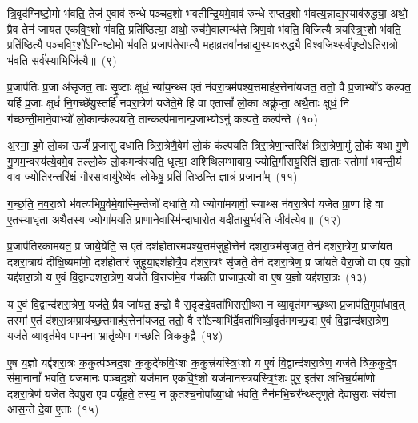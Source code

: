 त्रि॒वृद॑ग्निष्टो॒मो भ॑वति॒ तेज॑ ए॒वाव॑ रुन्धे पञ्चद॒शो भ॑वतीन्द्रि॒यमे॒वाव॑ रुन्धे सप्तद॒शो भ॑वत्य॒न्नाद्य॒स्याव॑रुद्ध्या॒ अथो॒ प्रैव तेन॑ जायत एकवि॒ꣳ॒शो भ॑वति॒ प्रति॑ष्ठित्या॒ अथो॒ रुच॑मे॒वात्मन्ध॑त्ते त्रिण॒वो भ॑वति॒ विजि॑त्यै त्रयस्त्रि॒ꣳ॒शो भ॑वति॒ प्रति॑ष्ठित्यै पञ्चवि॒ꣳ॒शो᳚\-ऽग्निष्टो॒मो भ॑वति प्र॒जाप॑ते॒राप्त्यै॑ महाव्र॒तवा॑न॒न्नाद्य॒स्याव॑रुद्ध्यै विश्व॒जिथ्सर्व॑पृष्ठो\-ऽतिरा॒त्रो भ॑वति॒ सर्व॑स्या॒भिजि॑त्यै॥~(९)

{}%

प्र॒जा\-प॑तिः प्र॒जा अ॑सृजत॒ ताः सृ॒ष्टाः क्षुधं॒ न्या॑य॒न्थ्स ए॒तं न॑वरा॒त्रम॑पश्य॒त्तमाह॑र॒त्तेना॑यजत॒ ततो॒ वै प्र॒जाभ्यो॑\-ऽ कल्पत॒ यर्\mbox{}हि॑ प्र॒जाः क्षुधं॑ नि॒गच्छे॑यु॒स्तर्\mbox{}हि॑ नवरा॒त्रेण॑ यजेते॒मे हि वा ए॒तासां᳚ लो॒का अकॢ॑प्ता॒ अथै॒ताः क्षुधं॒ नि ग॑च्छन्ती॒माने॒वाभ्यो॑ लो॒कान्क॑ल्पयति॒ तान्कल्प॑मानान्प्र॒जाभ्यो\-ऽनु॑ कल्पते॒ कल्प॑न्ते~(१०)

अ॒स्मा॒ इ॒मे लो॒का ऊर्जं॑ प्र॒जासु॑ दधाति त्रिरा॒त्रेणै॒वेमं लो॒कं क॑ल्पयति त्रिरा॒त्रेणा॒न्तरि॑क्षं त्रिरा॒त्रेणा॒मुं लो॒कं यथा॑ गु॒णे गु॒णम॒न्वस्य॑त्ये॒वमे॒व तल्लो॒के लो॒कमन्व॑स्यति॒ धृत्या॒ अशि॑थिलम्भावाय॒ ज्योति॒र्गौरायु॒रिति॑ ज्ञा॒ताः स्तोमा॑ भवन्ती॒यं वाव ज्योति॑र॒न्तरि॑क्षं॒ गौर॒सावायु॑रे॒ष्वे॑व लो॒केषु॒ प्रति॑ तिष्ठन्ति॒ ज्ञात्रं॑ प्र॒जाना᳚म्~(११)

ग॒च्छ॒ति॒ न॒व॒रा॒त्रो भ॑वत्यभिपू॒र्वमे॒वास्मि॒न्तेजो॑ दधाति॒ यो ज्योगा॑मयावी॒ स्याथ्स न॑वरा॒त्रेण॑ यजेत प्रा॒णा हि वा ए॒तस्याधृ॑ता॒ अथै॒तस्य॒ ज्योगा॑मयति प्रा॒णाने॒वास्मि॑न्दाधारो॒त यदी॒तासु॒र्भव॑ति॒ जीव॑त्ये॒व॥~(१२)

{\anuvakamend[{कल्प॑न्ते प्र॒जाना॒न्त्रय॑स्त्रिꣳशच्च}]}%

प्र॒जा\-प॑तिरकामयत॒ प्र जा॑ये॒येति॒ स ए॒तं दश॑होतारमपश्य॒त्तम॑जुहो॒त्तेन॑ दशरा॒त्रम॑सृजत॒ तेन॑ दशरा॒त्रेण॒ प्राजा॑यत दशरा॒त्राय॑ दीक्षि॒ष्यमा॑णो॒ दश॑होतारं जुहुया॒द्दश॑होत्रै॒व द॑शरा॒त्रꣳ सृ॑जते॒ तेन॑ दशरा॒त्रेण॒ प्र जा॑यते वैरा॒जो वा ए॒ष य॒ज्ञो यद्द॑शरा॒त्रो य ए॒वं वि॒द्वान्द॑शरा॒त्रेण॒ यज॑ते वि॒राज॑मे॒व ग॑च्छति प्राजाप॒त्यो वा ए॒ष य॒ज्ञो यद्द॑शरा॒त्रः~(१३)

य ए॒वं वि॒द्वान्द॑शरा॒त्रेण॒ यज॑ते॒ प्रैव जा॑यत॒ इन्द्रो॒ वै स॒दृङ्दे॒वता॑भिरासी॒थ्स न व्या॒वृत॑मगच्छ॒थ्स प्र॒जा\-प॑ति॒मुपा॑धाव॒त् तस्मा॑ ए॒तं द॑शरा॒त्रम्प्राय॑च्छ॒त्तमाह॑र॒त्तेना॑यजत॒ ततो॒ वै सो᳚\-ऽन्याभि॑र्दे॒वता॑भिर्व्या॒वृत॑मगच्छ॒द्य ए॒वं वि॒द्वान्द॑शरा॒त्रेण॒ यज॑ते व्या॒वृत॑मे॒व पा॒प्मना॒ भ्रातृ॑व्येण गच्छति त्रिक॒कुद्वै~(१४)

ए॒ष य॒ज्ञो यद्द॑शरा॒त्रः क॒कुत्प॑ञ्चद॒शः क॒कुदे॑कवि॒ꣳ॒शः क॒कुत्त्र॑यस्त्रि॒ꣳ॒शो य ए॒वं वि॒द्वान्द॑शरा॒त्रेण॒ यज॑ते त्रिक॒कुदे॒व स॑मा॒नानां᳚ भवति॒ यज॑मानः पञ्चद॒शो यज॑मान एकवि॒ꣳ॒शो यज॑मानस्त्रयस्त्रि॒ꣳ॒शः पुर॒ इत॑रा अभिच॒र्यमा॑णो दशरा॒त्रेण॑ यजेत देवपु॒रा ए॒व पर्यू॑हते॒ तस्य॒ न कुत॑श्च॒नोपा᳚व्या॒धो भ॑वति॒ नैन॑मभि॒चर᳚न्थ्स्तृणुते देवासु॒राः संय॑त्ता आस॒न्ते दे॒वा ए॒ताः~(१५)

